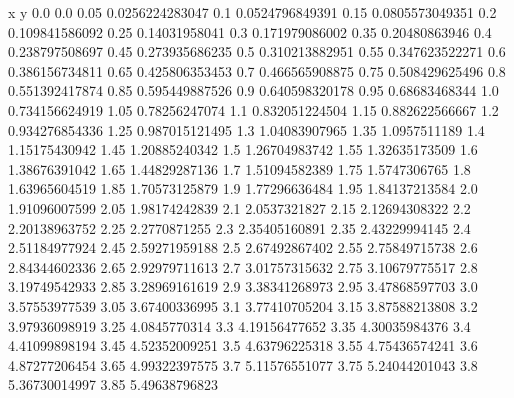               x                y
            0.0              0.0
           0.05  0.0256224283047
            0.1  0.0524796849391
           0.15  0.0805573049351
            0.2   0.109841586092
           0.25    0.14031958041
            0.3   0.171979086002
           0.35    0.20480863946
            0.4   0.238797508697
           0.45   0.273935686235
            0.5   0.310213882951
           0.55   0.347623522271
            0.6   0.386156734811
           0.65   0.425806353453
            0.7   0.466565908875
           0.75   0.508429625496
            0.8   0.551392417874
           0.85   0.595449887526
            0.9   0.640598320178
           0.95    0.68683468344
            1.0   0.734156624919
           1.05    0.78256247074
            1.1   0.832051224504
           1.15   0.882622566667
            1.2   0.934276854336
           1.25   0.987015121495
            1.3    1.04083907965
           1.35     1.0957511189
            1.4    1.15175430942
           1.45    1.20885240342
            1.5    1.26704983742
           1.55    1.32635173509
            1.6    1.38676391042
           1.65    1.44829287136
            1.7    1.51094582389
           1.75     1.5747306765
            1.8    1.63965604519
           1.85    1.70573125879
            1.9    1.77296636484
           1.95    1.84137213584
            2.0    1.91096007599
           2.05    1.98174242839
            2.1     2.0537321827
           2.15    2.12694308322
            2.2    2.20138963752
           2.25     2.2770871255
            2.3    2.35405160891
           2.35    2.43229994145
            2.4    2.51184977924
           2.45    2.59271959188
            2.5    2.67492867402
           2.55    2.75849715738
            2.6    2.84344602336
           2.65    2.92979711613
            2.7    3.01757315632
           2.75    3.10679775517
            2.8    3.19749542933
           2.85    3.28969161619
            2.9    3.38341268973
           2.95    3.47868597703
            3.0    3.57553977539
           3.05    3.67400336995
            3.1    3.77410705204
           3.15    3.87588213808
            3.2    3.97936098919
           3.25     4.0845770314
            3.3    4.19156477652
           3.35    4.30035984376
            3.4    4.41099898194
           3.45    4.52352009251
            3.5    4.63796225318
           3.55    4.75436574241
            3.6    4.87277206454
           3.65    4.99322397575
            3.7    5.11576551077
           3.75    5.24044201043
            3.8    5.36730014997
           3.85    5.49638796823
